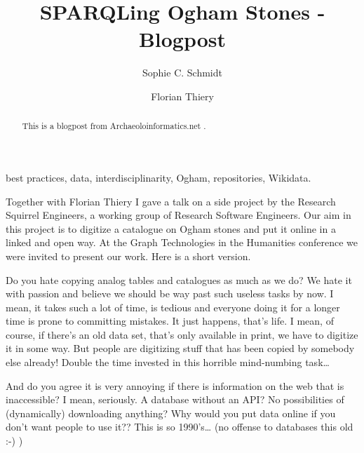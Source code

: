 \documentclass[twocolumn]{autart}
\begin{document}
\begin{frontmatter}

\title{SPARQLing Ogham Stones - Blogpost}
                                               

\author[SCS]{Sophie C. Schmidt}
\author[FT]{Florian Thiery}

\address[SCS]{ORCID: 0000-0003-4696-2101, Research Squirrel Engineers}
\address[FT]{ORCID: 0000-0002-3246-3531, Research Squirrel Engineers}

          
\begin{keyword}                             
best practices, data, interdisciplinarity, Ogham, repositories, Wikidata.
\end{keyword}

\begin{abstract}                         

This is a blogpost from Archaeoloinformatics.net\cite{schmidt_sparqling_2020} .

\end{abstract}

\end{frontmatter}

Together with Florian Thiery I gave a talk on a side project by the Research Squirrel Engineers, a working group of Research Software Engineers. Our aim in this project is to digitize a catalogue on Ogham stones and put it online in a linked and open way. At the Graph Technologies in the Humanities conference we were invited to present our work. Here is a short version.

Do you hate copying analog tables and catalogues as much as we do? We hate it with passion and believe we should be way past such useless tasks by now. I mean, it takes such a lot of time, is tedious and everyone doing it for a longer time is prone to committing mistakes. It just happens, that’s life. I mean, of course, if there’s an old data set, that’s only available in print, we have to digitize it in some way. But people are digitizing stuff that has been copied by somebody else already! Double the time invested in this horrible mind-numbing task…

And do you agree it is very annoying if there is information on the web that is inaccessible? I mean, seriously. A database without an API? No possibilities of (dynamically) downloading anything? Why would you put data online if you don’t want people to use it?? This is so 1990’s… (no offense to databases this old :-) )
\end{document}
